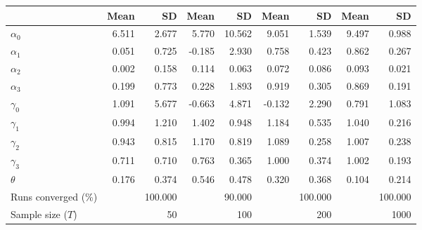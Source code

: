 
\begin{tabular}[t]{lrrrrrrrr}
\toprule
  & Mean & SD & Mean  & SD  & Mean   & SD   & Mean    & SD   \\
\midrule
$\alpha_{0}$ & 6.511 & 2.677 & 5.770 & 10.562 & 9.051 & 1.539 & 9.497 & 0.988\\
$\alpha_{1}$ & 0.051 & 0.725 & -0.185 & 2.930 & 0.758 & 0.423 & 0.862 & 0.267\\
$\alpha_{2}$ & 0.002 & 0.158 & 0.114 & 0.063 & 0.072 & 0.086 & 0.093 & 0.021\\
$\alpha_{3}$ & 0.199 & 0.773 & 0.228 & 1.893 & 0.919 & 0.305 & 0.869 & 0.191\\
$\gamma_{0}$ & 1.091 & 5.677 & -0.663 & 4.871 & -0.132 & 2.290 & 0.791 & 1.083\\
$\gamma_{1}$ & 0.994 & 1.210 & 1.402 & 0.948 & 1.184 & 0.535 & 1.040 & 0.216\\
$\gamma_{2}$ & 0.943 & 0.815 & 1.170 & 0.819 & 1.089 & 0.258 & 1.007 & 0.238\\
$\gamma_{3}$ & 0.711 & 0.710 & 0.763 & 0.365 & 1.000 & 0.374 & 1.002 & 0.193\\
$\theta$ & 0.176 & 0.374 & 0.546 & 0.478 & 0.320 & 0.368 & 0.104 & 0.214\\
Runs converged (\%) &  & 100.000 &  & 90.000 &  & 100.000 &  & 100.000\\
Sample size ($T$) &  & 50 &  & 100 &  & 200 &  & 1000\\
\bottomrule
\end{tabular}
